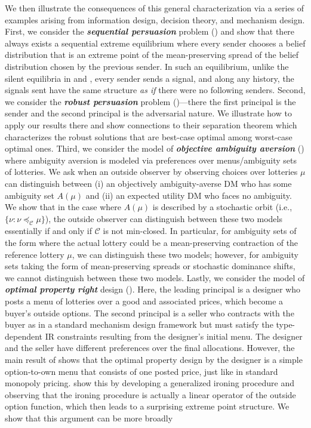 \documentclass[12pt,letterpaper]{article}
\newenvironment{original}{\color{black}}{}
\theoremstyle{plain}
\theoremstyle{definition}
\theoremstyle{remark}
\newcommand{\C}{\mathcal{C}}
\theoremstyle{definition}
\begin{document}
\begin{original}
We then illustrate the consequences of this general characterization via a series of examples arising from information design, decision theory, and mechanism design. First, we consider the \textit{\textbf{sequential persuasion}} problem (\citealt{LiNorman2021SequentialPersuasion}) and show that there always exists a sequential extreme equilibrium where every sender chooses a belief distribution that is an extreme point of the mean-preserving spread of the belief distribution chosen by the previous sender. In such an equilibrium, unlike the silent equilibria in \citet{LiNorman2021SequentialPersuasion} and \citet{wu2023sequential}, every sender sends a signal, and along any history, the signals sent have the same structure \textit{as if} there were no following senders. Second, we consider the \textit{\textbf{robust persuasion}} problem (\citealt{DworczakPavan2022RobustPersuasion})---there the first principal is the sender and the second principal is the adversarial nature. We illustrate how to apply our results there and show connections to their separation theorem which characterizes the robust solutions that are best-case optimal among worst-case optimal ones. Third, we consider the model of \textit{\textbf{objective ambiguity aversion}} (\citealt{olszewski2007preferences,Ahn2008AmbiguityWithoutStateSpace}) where ambiguity aversion is modeled via preferences over menus/ambiguity sets of lotteries. We ask when an outside observer by observing choices over lotteries $\mu$ can distinguish between (i) an objectively ambiguity-averse DM who has some ambiguity set $A(\mu)$ and (ii) an expected utility DM who faces no ambiguity. We show that in the case where $A(\mu)$ is described by a stochastic orbit (i.e., $\{\nu: \nu \preceq_\C \mu\}$), the outside observer can distinguish between these two models essentially if and only if $\C$ is not min-closed. In particular, for ambiguity sets of the form where the actual lottery could be a mean-preserving contraction of the reference lottery $\mu$, we can distinguish these two models; however, for ambiguity sets taking the form of  mean-preserving spreads or stochastic dominance shifts, we cannot distinguish between these two models. Lastly, we consider the model of \textit{\textbf{optimal property right}} design (\citealt{DworczakMuir2024}). Here, the leading principal is a designer who posts a menu of lotteries over a good and associated prices, which become a buyer's outside options. The second principal is a seller who contracts with the buyer as in a standard mechanism design framework but must satisfy the type-dependent IR constraints resulting from the designer's initial menu. The designer and the seller have different preferences over the final allocations. However, the main result of \citet{DworczakMuir2024} shows that the optimal property design by the designer is a simple option-to-own menu that consists of one posted price, just like in standard monopoly pricing. \citet{DworczakMuir2024} show this by developing a generalized ironing procedure and observing that the ironing procedure is actually a linear operator of the outside option function, which then leads to a surprising extreme point structure. We show that this argument can be more broadly 
\end{original}
\end{document}
